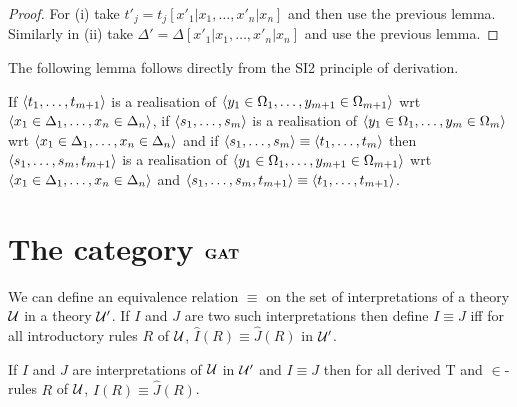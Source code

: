   \begin{proof}
    For (i) take $t'_j = t_j[x'_1|x_1, \dots, x'_n|x_n]$ and then use the previous lemma.
    Similarly in (ii) take $\Delta' = \Delta[x'_1|x_1, \dots, x'_n|x_n]$ and use the previous lemma.
  \end{proof}

  The following lemma follows directly from the SI2 principle of derivation.

  \begin{lemma}
    If $\langle t_1, \dots, t_{m+1} \rangle$ is a realisation of $\langle y_1 \in \Omega_1, \dots, y_{m+1} \in \Omega_{m+1} \rangle$ wrt $\langle x_1 \in \Delta_1, \dots, x_n \in \Delta_n \rangle$, if $\langle s_1, \dots, s_m \rangle$ is a realisation of $\langle y_1 \in \Omega_1, \dots, y_m \in \Omega_m \rangle$ wrt $\langle x_1 \in \Delta_1, \dots, x_n \in \Delta_n \rangle$ and if $\langle s_1, \dots, s_m \rangle \equiv \langle t_1, \dots, t_m \rangle$ then $\langle s_1, \dots, s_m, t_{m+1} \rangle$ is a realisation of $\langle y_1 \in \Omega_1, \dots, y_{m+1} \in \Omega_{m+1} \rangle$ wrt $\langle x_1 \in \Delta_1, \dots, x_n \in \Delta_n \rangle$ and $\langle s_1, \dots, s_m, t_{m+1} \rangle \equiv \langle t_1, \dots, t_{m+1} \rangle$.
  \end{lemma}

  \section{The category $\mathbf{GAT}$} \label{sec:source-1-14}

  We can define an equivalence relation $\equiv$ on the set of interpretations of a theory $\mathcal{U}$ in a theory $\mathcal{U}'$.
  If $I$ and $J$ are two such interpretations then define $I \equiv J$ iff for all introductory rules $R$ of $\mathcal{U}$, $\hat{I}(R) \equiv \hat{J}(R)$ in $\mathcal{U}'$.

  \begin{lemma}
    If $I$ and $J$ are interpretations of $\mathcal{U}$ in $\mathcal{U}'$ and $I \equiv J$ then for all derived T and $\in$-rules $R$ of $\mathcal{U}$, $\hat{I}(R) \equiv \hat{J}(R)$.
  \end{lemma}

